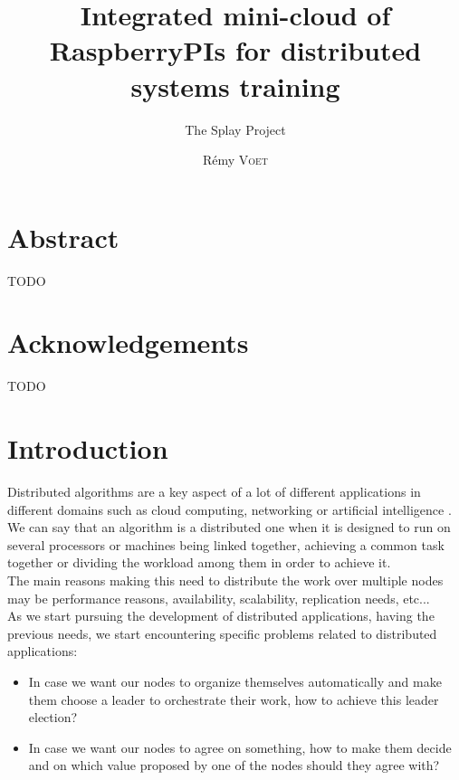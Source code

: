 \documentclass{eplmastersthesis}
\title{Integrated mini-cloud of RaspberryPIs for distributed systems training}
\subtitle{The Splay Project}
\author{Rémy \textsc{Voet}}
\begin{document}
  \maketitle

  \chapter*{Abstract}
  {\color{red} TODO}

  \chapter*{Acknowledgements}
  {\color{red} TODO}

  \tableofcontents

  \chapter{Introduction}



    Distributed algorithms are a key aspect of a lot of different
    applications in different domains such as cloud computing, networking
    or artificial intelligence \cite{DistributedArtificialIntelligence}.\\
    We can say that an algorithm is a distributed one when it is designed to
    run on several processors or machines being linked together, achieving
    a common task together or dividing the workload among them in order to
    achieve it.\\
    The main reasons making this need to distribute the work over multiple
    nodes may be performance reasons, availability, scalability, replication
    needs, etc...\\
    As we start pursuing the development of distributed applications, having
    the previous needs, we start encountering specific problems related to
    distributed applications:
    \begin{itemize}
      \item In case we want our nodes to organize themselves automatically and
      make them choose a leader to orchestrate their work, how to achieve
      this leader election?
      \item In case we want our nodes to agree on something, how to make
      them decide and on which value proposed by one of the nodes should they
      agree with?
    \end{itemize}
\end{document}
